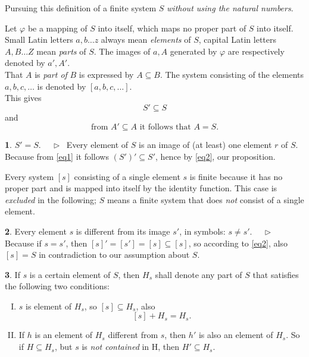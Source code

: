 \documentclass[leqno,hidelinks]{article}
\theoremstyle{definition}
\newtheorem{satz}{\protect\satzname}
\newtheorem{deff}[satz]{\protect\deffname}
\newcommand{\satzname}{}
\newcommand{\deffname}{}
\renewcommand{\satzname}{\hspace{-4pt}.\ Satz}%
\renewcommand{\deffname}{\hspace{-4pt}.\ Definition}%
\renewcommand{\satzname}{\hspace{-4pt}.\ Theorem}%
\renewcommand{\deffname}{\hspace{-4pt}.\ Definition}%
\newcommand\Beweis{\medskip \newline $ \phantom{'.'} \rhd \ $}%
\newcommand{\partof}{\subseteq}
\begin{document}
\begin{paracol}{2}
Pursuing this definition of a finite system $S$ \emph{without using the natural numbers}.

Let $\varphi$ be a mapping of $S$ into itself, which maps no proper part of $S$
into itself. Small Latin letters $a, b \ldots z$ always mean \emph{elements} of
$S$, capital Latin letters $A, B \ldots Z$ mean \emph{parts} of $S$. The images
of $a, A$ generated by $\varphi$ are respectively denoted by $a', A'$.
\ \\

That $A$ is \emph{part of} $B$ is expressed by $A \partof B$. The system consisting
of the elements $a, b, c, \ldots$ is denoted by $[a, b, c, \ldots]$.
\ \\

This gives
\begin{equation}\label{eq1}
				S' \partof S
\end{equation}
and %
\begin{equation}\label{eq2}
		\text{from } A' \partof A \text{ it follows that } A = S.
\end{equation}


\begin{satz}\label{thm1}$S' = S$.
\Beweis
Every element of $S$ is an image of (at least) one element $r$ of $S$. Because
from \eqref{eq1} it follows $(S')' \partof S'$, hence by \eqref{eq2}, our proposition.
\end{satz}
Every system $[s]$ consisting of a single element $s$ is finite because it has
no proper part and is mapped into itself by the identity function. This case is
\emph{excluded} in the following; $S$ means a finite system that does \emph{not}
consist of a single element.

\begin{satz}\label{thm2}
Every element $s$ is different from its image $s'$, in symbols: $s \neq s'$.
\Beweis
Because if $s = s'$, then $[s]' = [s'] = [s] \partof [s]$, so according to
\eqref{eq2}, also $[s] = S$ in contradiction to our assumption about $S$.
\end{satz}

\newpage

\begin{deff}\label{def3}
If $s$ is a certain element of $S$, then $H_s$ shall denote any part of $S$ that
satisfies the following two conditions:
\vspace{8pt} %

\begin{enumerate}[I.]
\item $s$ is element of $H_s$, so $[s] \partof H_s$, also
\[
	[s] + H_s = H_s.
\]
\item If $h$ is an element of $H_s$ different from $s$, then $h'$ is also an
element of $H_s$. So if $H \partof H_s$, but $s$ is \emph{not contained} in H,
then $H' \partof H_s$.
\end{enumerate}
\end{deff}


\end{paracol}
\end{document}
